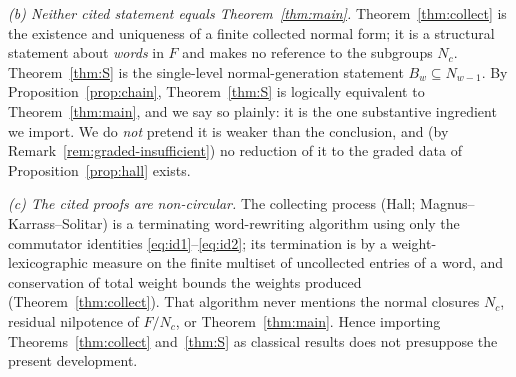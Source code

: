 \documentclass{amsart}
\theoremstyle{definition}
\theoremstyle{remark}
\begin{document}
\emph{(b) Neither cited statement equals Theorem~\ref{thm:main}.}
Theorem~\ref{thm:collect} is the existence and uniqueness of a finite collected
normal form; it is a structural statement about \emph{words} in $F$ and makes no
reference to the subgroups $N_c$. Theorem~\ref{thm:S} is the single-level
normal-generation statement $B_w\subseteq N_{w-1}$. By
Proposition~\ref{prop:chain}, Theorem~\ref{thm:S} is logically equivalent to
Theorem~\ref{thm:main}, and we say so plainly: it is the one substantive ingredient
we import. We do \emph{not} pretend it is weaker than the conclusion, and (by
Remark~\ref{rem:graded-insufficient}) no reduction of it to the graded data of
Proposition~\ref{prop:hall} exists.

\emph{(c) The cited proofs are non-circular.} The collecting process (Hall;
Magnus--Karrass--Solitar) is a terminating word-rewriting algorithm using only the
commutator identities \eqref{eq:id1}--\eqref{eq:id2}; its termination is by a
weight-lexicographic measure on the finite multiset of uncollected entries of a
word, and conservation of total weight bounds the weights produced
(Theorem~\ref{thm:collect}). That algorithm never mentions the normal closures
$N_c$, residual nilpotence of $F/N_c$, or Theorem~\ref{thm:main}. Hence importing
Theorems~\ref{thm:collect} and~\ref{thm:S} as classical results does not presuppose
the present development.
\end{document}
